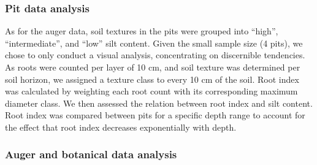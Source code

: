 \documentclass[fleqn,12pt]{latex/stylish_article} %
\begin{document}
\hypertarget{pit-data-analysis}{%
\subsubsection{Pit data analysis}\label{pit-data-analysis}}

As for the auger data, soil textures in the pits were grouped into \enquote{high}, \enquote{intermediate}, and \enquote{low} silt content. Given the small sample size (4 pits), we chose to only conduct a visual analysis, concentrating on discernible tendencies. As roots were counted per layer of 10 cm, and soil texture was determined per soil horizon, we assigned a texture class to every 10 cm of the soil.
Root index was calculated by weighting each root count with its corresponding maximum diameter class. We then assessed the relation between root index and silt content. Root index was compared between pits for a specific depth range to account for the effect that root index decreases exponentially with depth.

\hypertarget{auger-and-botanical-data-analysis}{%
\subsubsection{Auger and botanical data analysis}\label{auger-and-botanical-data-analysis}}
\end{document}

